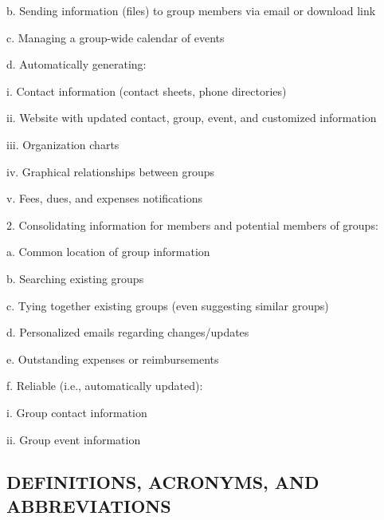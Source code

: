 \documentclass[letterpaper]{article}
\newcommand\textstyleDefaultParagraphFont[1]{#1}
\begin{document}
{\color{black}
\textstyleDefaultParagraphFont{b. Sending information (files) to group
members via email or download link}}

{\color{black}
\textstyleDefaultParagraphFont{c. Managing a group-wide calendar of
events}}

{\color{black}
\textstyleDefaultParagraphFont{d. Automatically generating:}}

{\color{black}
\textstyleDefaultParagraphFont{i. Contact information (contact sheets,
phone directories)}}

{\color{black}
\textstyleDefaultParagraphFont{ii. Website with updated contact, group,
event, and customized information}}

{\color{black}
\textstyleDefaultParagraphFont{iii. Organization charts}}

{\color{black}
\textstyleDefaultParagraphFont{iv. Graphical relationships between
groups}}

{\color{black}
\textstyleDefaultParagraphFont{v. Fees, dues, and expenses
notifications}}

{\color{black}
\textstyleDefaultParagraphFont{2. Consolidating information for members
and potential members of groups:}}

{\color{black}
\textstyleDefaultParagraphFont{a. Common location of group information}}

{\color{black}
\textstyleDefaultParagraphFont{b. Searching existing groups}}

{\color{black}
\textstyleDefaultParagraphFont{c. Tying together existing groups (even
suggesting similar groups)}}

{\color{black}
\textstyleDefaultParagraphFont{d. Personalized emails regarding
changes/updates}}

{\color{black}
\textstyleDefaultParagraphFont{e. Outstanding expenses or
reimbursements}}

{\color{black}
\textstyleDefaultParagraphFont{f. Reliable (i.e., automatically
updated):}}

{\color{black}
\textstyleDefaultParagraphFont{i. Group contact information}}

{\color{black}
\textstyleDefaultParagraphFont{ii. Group event information}}

\subsection[DEFINITIONS, ACRONYMS, AND ABBREVIATIONS]{\rmfamily
DEFINITIONS, ACRONYMS, AND ABBREVIATIONS}
\end{document}
